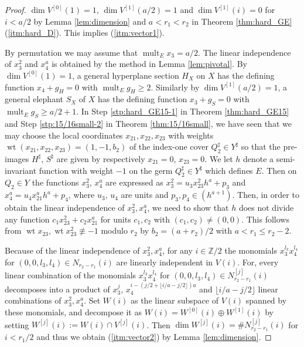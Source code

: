\documentclass[a4paper,11pt]{amsart}
\theoremstyle{definition}
\theoremstyle{remark}
\numberwithin{equation}{section}
\newcommand{\bZ}{{\mathbb Z}}
\newcommand{\mult}{\operatorname{mult}}
\newcommand{\wt}{\operatorname{wt}}
\newcommand{\rd}[1]{\lfloor{#1}\rfloor}
\begin{document}
\begin{proof}
$\dim V^{[0]}(1)=1$,
$\dim V^{[1]}(a/2)=1$ and $\dim V^{[1]}(i)=0$ for $i<a/2$
by Lemma \ref{lem:dimension} and $a<r_1<r_2$
in Theorem \ref{thm:hard_GE}(\ref{itm:hard_D}).
This implies (\ref{itm:vector1}).

By permutation we may assume that $\mult_Ex_3=a/2$.
The linear independence of $x_3^2$ and $x_4^a$ is obtained
by the method in Lemma \ref{lem:pivotal}.
By $\dim V^{[0]}(1)=1$,
a general hyperplane section $H_X$ on $X$
has the defining function $x_4+g_H=0$ with $\mult_E g_H \ge 2$.
Similarly by $\dim V^{[1]}(a/2)=1$,
a general elephant $S_X$ of $X$
has the defining function $x_3+g_S=0$ with $\mult_E g_S \ge a/2+1$.
In Step \ref{stp:hard_GE15-1} in Theorem \ref{thm:hard_GE15}
and Step \ref{stp:15/16small-2} in Theorem \ref{thm:15/16small},
we have seen that we may choose the local coordinates
$x_{21},x_{22},x_{23}$ with weights $\wt(x_{21},x_{22},x_{23})=(1,-1,b_2)$
of the index-one cover $Q_2^\sharp \in Y^\sharp$ so that
the pre-images $H^\sharp$, $S^\sharp$
are given by respectively $x_{21}=0$, $x_{23}=0$.
We let $h$ denote a semi-invariant function with weight $-1$
on the germ $Q_2^\sharp \in Y^\sharp$ which defines $E$.
Then on $Q_2 \in Y$ the functions $x_3^2$, $x_4^a$ are expressed as
$x_3^2=u_3x_{23}^2h^a+p_3$ and $x_4^a=u_4x_{21}^ah^a+p_4$,
where $u_3$, $u_4$ are units and $p_3,p_4\in(h^{a+1})$.
Then,
in order to obtain the linear independence of $x_3^2,x_4^a$,
we need to show that $h$ does not divide
any function $c_1x_{23}^2+c_2x_{21}^a$
for units $c_1,c_2$ with $(c_1,c_2)\neq(0,0)$.
This follows from
$\wt x_{23}, \wt x_{23}^2 \not\equiv -1$ modulo $r_2$
by $b_2=(a+r_2)/2$ with $a<r_1\le r_2-2$.

Because of the linear independence of $x_3^2,x_4^a$,
for any $i \in \bZ/2$ the monomials $x_3^{l_3}x_4^{l_4}$
for $(0,0,l_3,l_4)\in N_{r_2-r_1}(i)$ are linearly independent in $V(i)$.
For,
every linear combination of the monomials $x_3^{l_3}x_4^{l_4}$
for $(0,0,l_3,l_4)\in N_{r_2-r_1}^{[j]}(i)$ decomposes
into a product of $x_3^j$, $x_4^{i-(j/2+\rd{i/a-j/2})a}$ and
$\rd{i/a-j/2}$ linear combinations of $x_3^2,x_4^a$.
Set $W(i)$ as the linear subspace of $V(i)$ spanned by these monomials,
and decompose it as $W(i)=W^{[0]}(i) \oplus W^{[1]}(i)$
by setting $W^{[j]}(i):=W(i) \cap V^{[j]}(i)$.
Then $\dim W^{[j]}(i)=\#N_{r_2-r_1}^{[j]}(i)$ for $i<r_1/2$ and
thus we obtain (\ref{itm:vector2}) by Lemma \ref{lem:dimension}.


\end{proof}
\end{document}
